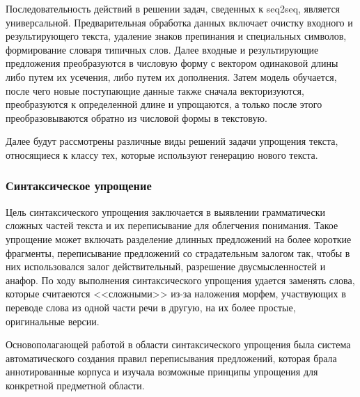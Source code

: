 Последовательность действий в решении задач, сведенных к seq2seq, является универсальной. Предварительная обработка данных включает очистку входного и результирующего текста, удаление знаков препинания и специальных символов, формирование словаря типичных слов. Далее входные и результирующие предложения преобразуются в числовую форму с вектором одинаковой длины либо путем их усечения, либо путем их дополнения. Затем модель обучается, после чего новые поступающие данные также сначала векторизуются, преобразуются к определенной длине и упрощаются, а только после этого преобразовываются обратно из числовой формы в текстовую.

Далее будут рассмотрены различные виды решений задачи упрощения текста, относящиеся к классу тех, которые используют генерацию нового текста.

\subsubsection{Синтаксическое упрощение}

Цель синтаксического упрощения заключается в выявлении грамматически сложных частей текста и их переписывание для облегчения понимания. Такое упрощение может включать разделение длинных предложений на более короткие фрагменты, переписывание предложений со страдательным залогом так, чтобы в них использовался залог действительный\footnotemark{}, разрешение двусмысленностей и анафор\cite{shardlow_survey_2014}. По ходу выполнения синтаксического упрощения удается заменять слова, которые считаеются <<сложными>> из-за наложения морфем, участвующих в переводе слова из одной части речи в другую, на их более простые, оригинальные версии.


Основополагающей работой в области синтаксического упрощения была система автоматического создания правил переписывания предложений\cite{chandrasekar_automatic_1997}, которая брала аннотированные корпуса и изучала возможные принципы упрощения для конкретной предметной области.  

